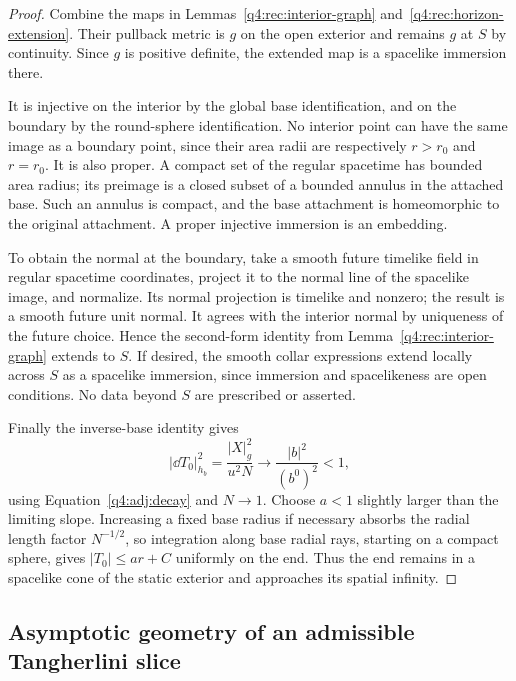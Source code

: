 \begin{proof}
Combine the maps in Lemmas~\ref{q4:rec:interior-graph}
and~\ref{q4:rec:horizon-extension}.  Their pullback metric is $g$ on the open
exterior and remains $g$ at $S$ by continuity.  Since $g$ is positive definite,
the extended map is a spacelike immersion there.

It is injective on the interior by the global base identification, and on the
boundary by the round-sphere identification.  No interior point can have the
same image as a boundary point, since their area radii are respectively
$r>r_0$ and $r=r_0$.  It is also proper.  A compact set of the regular
spacetime has bounded area radius; its preimage is a closed subset of a
bounded annulus in the attached base.  Such an annulus is compact, and the
base attachment is homeomorphic to the original attachment.  A proper
injective immersion is an embedding.

To obtain the normal at the boundary, take a smooth future timelike field in
regular spacetime coordinates, project it to the normal line of the spacelike
image, and normalize.  Its normal projection is timelike and nonzero; the
result is a smooth future unit normal.  It agrees with the interior normal
by uniqueness of the future choice.  Hence the second-form identity from
Lemma~\ref{q4:rec:interior-graph} extends to $S$.  If desired, the smooth collar
expressions extend locally across $S$ as a spacelike immersion, since
immersion and spacelikeness are open conditions.  No data beyond $S$ are
prescribed or asserted.

Finally the inverse-base identity gives
\begin{equation}
 |\dd T_0|_{h_b}^2
 =\frac{|X|_g^2}{u^2N}
 \longrightarrow \frac{|b|^2}{(b^0)^2}<1,
 \label{q4:rec:spatial-infinity}
\end{equation}
using Equation~\eqref{q4:adj:decay} and $N\to1$.
Choose $a<1$ slightly larger than the limiting slope.  Increasing a fixed
base radius if necessary absorbs the radial length factor $N^{-1/2}$, so
integration along base radial rays, starting on a compact sphere, gives
$|T_0|\leq ar+C$ uniformly on the end.  Thus the end remains in a spacelike
cone of the static exterior and approaches its spatial infinity.
\end{proof}

\subsection{Asymptotic geometry of an admissible Tangherlini slice}

